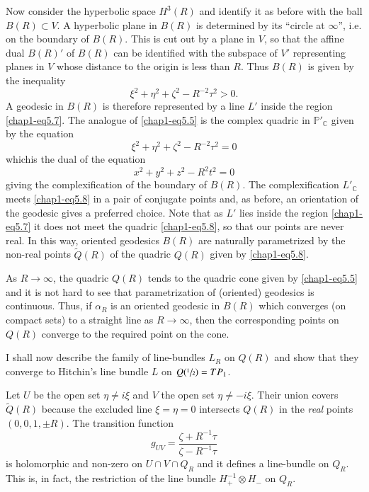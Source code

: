 Now consider the hyperbolic space $H^{3}(R)$ and identify it as before
with the ball $B(R)\subset V$. A hyperbolic plane in $B(R)$ is
determined by its ``circle at $\infty$'', i.e. on the boundary of
$B(R)$. This is cut out by a plane in $V$, so that the affine dual
$B(R)'$ of $B(R)$ can be identified with the subspace of $V'$
representing planes in $V$ whose distance to the origin is less than
$R$. Thus $B(R)$ is given by the inequality
\begin{equation}
\xi^{2}+\eta^{2}+\zeta^{2}-R^{-2}\tau^{2}>0.\label{chap1-eq5.7}
\end{equation}
A geodesic in $B(R)$ is therefore represented by a line $L'$ inside
the region \eqref{chap1-eq5.7}. The analogue of \eqref{chap1-eq5.5} is
the complex quadric in $\mathbb{P}'_{\mathbb{C}}$ given by the
equation
\begin{equation}
\xi^{2}+\eta^{2}+\zeta^{2}-R^{-2}\tau^{2}=0\label{chap1-eq5.8}
\end{equation}
which\pageoriginale is the dual of the equation
\begin{equation}
x^{2}+y^{2}+z^{2}-R^{2}t^{2}=0\label{chap1-eq5.9}
\end{equation}
giving the complexification of the boundary of $B(R)$. The
complexification $L'_{\mathbb{C}}$ meets \eqref{chap1-eq5.8} in a pair
of conjugate points and, as before, an orientation of the geodesic
gives a preferred choice. Note that as $L'$ lies inside the region
\eqref{chap1-eq5.7} it does not meet the quadric \eqref{chap1-eq5.8},
so that our points are never real. In this way, oriented geodesics
$B(R)$ are naturally parametrized by the non-real points
$\widetilde{Q}(R)$ of the quadric $Q(R)$ given by \eqref{chap1-eq5.8}.

As $R\to \infty$, the quadric $Q(R)$ tends to the quadric cone given
by \eqref{chap1-eq5.5} and it is not hard to see that parametrization
of (oriented) geodesics is continuous. Thus, if $\alpha_{R}$ is an
oriented geodesic in $B(R)$ which converges (on compact sets) to a
straight line as $R\to \infty$, then the corresponding points on
$Q(R)$ converge to the required point on the cone.

I shall now describe the family of line-bundles $L_{R}$ on $Q(R)$ and
show that they converge to Hitchin's line bundle $L$ on
$Q(\sfrac{1}{2})=TP_{1}$. 

Let $U$ be the open set $\eta\neq i\xi$ and $V$ the open set $\eta\neq
-i\xi$. Their union covers $\widetilde{Q}(R)$ because the excluded
line $\xi=\eta=0$ intersects $Q(R)$ in the {\em real} points
$(0,0,1,\pm R)$. The transition function
$$
g_{UV}=\dfrac{\zeta+R^{-1}\tau}{\zeta-R^{-1}\tau}
$$
is holomorphic and non-zero on $U\cap V\cap Q_{R}$ and it defines a
line-bundle on $Q_{R}$. This is, in fact, the restriction of the line
bundle $H^{-1}_{+}\otimes H_{-}$ on $Q_{R}$.

